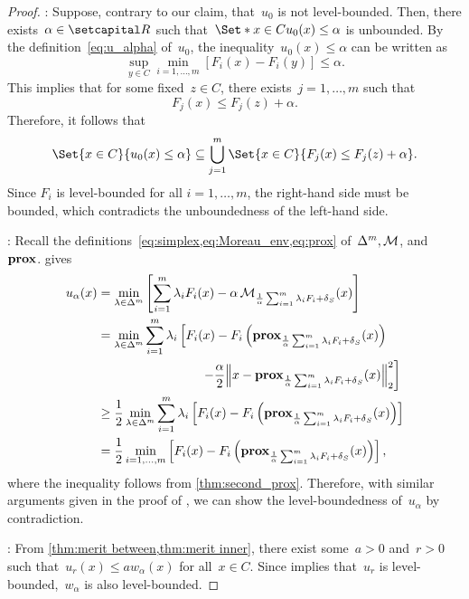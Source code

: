 \documentclass[../main]{subfiles}
\begin{document}
\begin{proof}
    : Suppose, contrary to our claim, that~$u_0$ is not level-bounded.
    Then, there exists~$\alpha \in \setR$ such that~$\Set*{ x \in C }{ u_0(x) \le \alpha }$ is unbounded.
    By the definition~\cref{eq:u_alpha} of~$u_0$, the inequality~$u_0(x) \le \alpha$ can be written as
    \[
        \sup_{y \in C} \min_{i = 1, \dots, m} [ F_i(x) - F_i(y) ] \le \alpha.
    \]
    This implies that for some fixed~$z \in C$, there exists~$j = 1, \dots, m$ such that
    \[
        F_j(x) \le F_j(z) + \alpha.
    \]
    Therefore, it follows that
    \[
        \Set{ x \in C}{ u_0(x) \le \alpha } \subseteq \bigcup_{j = 1}^m \Set{ x \in C }{ F_j(x) \le F_j(z) + \alpha }.
    \]
    Since $F_i$ is level-bounded for all $i = 1, \dots, m$, the right-hand side must be bounded, which contradicts the unboundedness of the left-hand side.

    : Recall the definitions~\cref{eq:simplex,eq:Moreau_env,eq:prox} of~$\Delta^m,\operatorname{\mathcal{M}}$, and~$\operatorname{\mathbf{prox}}$.
     gives
    \[
        \begin{split}
            u_\alpha(x) &= \min_{\lambda \in \Delta^m} \left[ \sum_{i = 1}^{m} \lambda_i F_i(x) - \alpha \envelope_{\frac{1}{\alpha} \sum_{i = 1}^{m} \lambda_i F_i + \indicator_S}(x) \right] \\
                      &\begin{multlined}
                          = \min_{\lambda \in \Delta^m} \sum_{i = 1}^{m} \lambda_i \left[ F_i(x) - F_i\left( \prox_{\frac{1}{\alpha} \sum_{i = 1}^{m} \lambda_i F_i + \indicator_S}(x) \right) \right. \\
                          \left.- \frac{\alpha}{2} \norm*{x - \prox_{\frac{1}{\alpha} \sum_{i = 1}^{m} \lambda_i F_i + \indicator_S}(x)}_2^2 \right] 
                      \end{multlined} \\
                      &\ge \frac{1}{2} \min_{\lambda \in \Delta^m} \sum_{i = 1}^{m} \lambda_i \left[ F_i(x) - F_i\left( \prox_{\frac{1}{\alpha} \sum_{i = 1}^{m} \lambda_i F_i + \indicator_S}(x) \right) \right] \\
                      &= \frac{1}{2} \min_{i = 1, \dots, m} \left[ F_i(x) - F_i\left( \prox_{\frac{1}{\alpha} \sum_{i = 1}^{m} \lambda_i F_i + \indicator_S}(x) \right) \right] 
        ,\end{split}
    \] 
    where the inequality follows from \cref{thm:second_prox}.
    Therefore, with similar arguments given in the proof of , we can show the level-boundedness of~$u_\alpha$ by contradiction.

    : From \cref{thm:merit between,thm:merit inner}, there exist some~$a > 0$ and~$r > 0$ such that~$u_r(x) \le a w_\alpha(x)$ for all~$x \in C$.
    Since  implies that~$u_r$ is level-bounded,~$w_\alpha$ is also level-bounded.
\end{proof}
\end{document}
